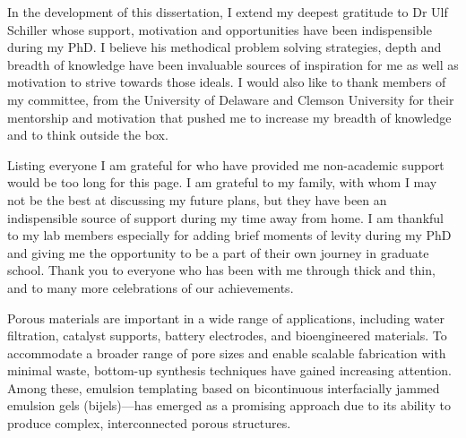 \begin{front} %


In the development of this dissertation, I extend my deepest gratitude to Dr Ulf Schiller whose support, motivation and 
opportunities have been indispensible during my PhD. I believe his methodical problem solving strategies, depth and 
breadth of knowledge have been invaluable sources of inspiration for me as well as 
motivation to strive towards those ideals. I would also like to thank members of my committee, 
from the University of Delaware and Clemson University for their mentorship 
and motivation that pushed me to increase my breadth of knowledge and to think outside the box.

Listing everyone I am grateful for who have provided me non-academic support would be too long for this page. 
I am grateful to my family, with whom I may not be the best at 
discussing my future plans, but they have been an indispensible source of support during my time away from home. 
I am thankful to my lab members especially for adding brief moments of levity during my PhD and giving me the 
opportunity to be a part of their own journey in graduate school. Thank you to everyone who has been with me 
through thick and thin, and to many more celebrations of our achievements. 




\maketocloflot

    Porous materials are important in a wide range of applications, including water filtration, 
    catalyst supports, battery electrodes, and bioengineered materials. To accommodate a broader range of pore 
    sizes and enable scalable fabrication with minimal waste, bottom-up synthesis techniques have gained 
    increasing attention. Among these, emulsion templating based on bicontinuous interfacially jammed 
    emulsion gels (bijels)—has emerged as a promising approach due to its ability to produce complex, 
    interconnected porous structures.


\end{front}
